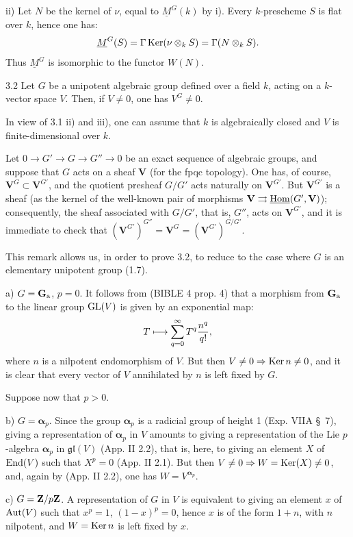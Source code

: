 \noindent ii) Let $N$ be the kernel of $\nu$, equal to $\underline M^G(k)$ by i). Every $k$-prescheme $S$ is flat over $k$, hence one has:
\[
 \underline M^G(S)=\Gamma\operatorname{Ker}(\nu\otimes_k S)=\Gamma(N\otimes_k S).
\]
Thus $\underline M^G$ is isomorphic to the functor $W(N)$.

\begin{proposition}{3.2}\label{XVII.3.2}
Let $G$ be a unipotent algebraic group defined over a field $k$, acting on a $k$-vector space $V$. Then, if $V\neq0$, one has $V^G\neq0$.
\end{proposition}
In view of 3.1 ii) and iii), one can assume that $k$ is algebraically closed and $V$ is finite-dimensional over $k$.

Let $0\to G'\to G\to G''\to0$ be an exact sequence of algebraic groups, and suppose that $G$ acts on a sheaf $\mathbf V$ (for the fpqc topology). One has, of course, $\mathbf V^G\subset\mathbf V^{G'}$, and the quotient presheaf $G/G'$ acts naturally on $\mathbf V^{G'}$. But $\mathbf V^{G'}$ is a sheaf (as the kernel of the well-known pair of morphisms $\mathbf V\rightrightarrows\underline{\operatorname{Hom}}(G',\mathbf V)$); consequently, the sheaf associated with $G/G'$, that is, $G''$, acts on $\mathbf V^{G'}$, and it is immediate to check that $(\mathbf V^{G'})^{G''}=\mathbf V^G=(\mathbf V^{G'})^{G/G'}$.

This remark allows us, in order to prove 3.2, to reduce to the case where $G$ is an elementary unipotent group (1.7).

\noindent a) $G=\mathbf{G}_{\mathrm{a}}$, $p=0$. It follows from (BIBLE 4 prop. 4) that a morphism from $\mathbf{G}_{\mathrm{a}}$ to the linear group $\operatorname{GL}(V)$ is given by an exponential map:
\[
 T\longmapsto\sum_{q=0}^\infty T^q\frac{n^q}{q!},
\]
where $n$ is a nilpotent endomorphism of $V$. But then $V\neq0\Rightarrow\operatorname{Ker} n\neq0$, and it is clear that every vector of $V$ annihilated by $n$ is left fixed by $G$.

Suppose now that $p>0$.

\noindent b) $G=\boldsymbol\alpha_p$. Since the group $\boldsymbol\alpha_p$ is a radicial group of height 1 (Exp. VIIA \S~7), giving a representation of $\boldsymbol\alpha_p$ in $V$ amounts to giving a representation of the Lie $p$-algebra $\boldsymbol\alpha_p$ in $\mathfrak{gl}(V)$ (App. II 2.2), that is, here, to giving an element $X$ of $\operatorname{End}(V)$ such that $X^p=0$ (App. II 2.1). But then $V\neq0\Rightarrow W=\operatorname{Ker}(X)\neq0$, and, again by (App. II 2.2), one has $W=V^{\boldsymbol\alpha_p}$.

\noindent c) $G=\mathbf{Z}/p\mathbf{Z}$. A representation of $G$ in $V$ is equivalent to giving an element $x$ of $\operatorname{Aut}(V)$ such that $x^p=1$, \ie $(1-x)^p=0$, hence $x$ is of the form $1+n$, with $n$ nilpotent, and $W=\operatorname{Ker} n$ is left fixed by $x$.

